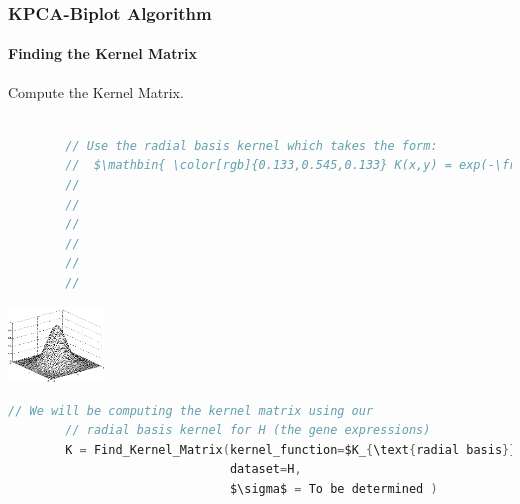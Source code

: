 \documentclass[serif]{beamer}
\newcommand{\codepause}{\pause \vspace{-0.165in} }
\begin{document}
	\begin{frame}[t, fragile]
		\frametitle{KPCA-Biplot Algorithm}
		\framesubtitle{Finding the Kernel Matrix}
		
		Compute the Kernel Matrix.
		
		\begin{lstlisting}[mathescape, language=C]
		
		// Use the radial basis kernel which takes the form:
		//  $\mathbin{ \color[rgb]{0.133,0.545,0.133} K(x,y) = exp(-\frac{{ \left\| x-y \right\|  }^{ 2 }}{2\sigma^{2}})}$
		// 
		// 
		//
		//
		//
		//
		\end{lstlisting}
		\vspace{-1.10in}
		\begin{center}
		\includegraphics[width=1.0in]{images/rbf_kernel}	
		\end{center}
		\vspace{-0.07in}
		\codepause
		\begin{lstlisting}[mathescape, language=C]
		// We will be computing the kernel matrix using our
		// radial basis kernel for H (the gene expressions)
		K = Find_Kernel_Matrix(kernel_function=$K_{\text{radial basis}}(x,y)$,
		                       dataset=H,
		                       $\sigma$ = To be determined )
		
		\end{lstlisting}

	\end{frame}
	
\end{document}
